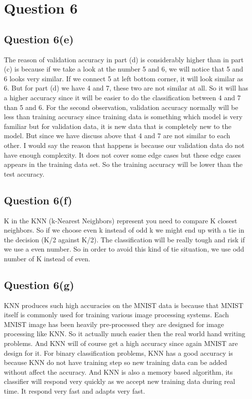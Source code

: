 \documentclass{article}
\begin{document}
        
\section{Question 6}
 \subsection{Question 6(e)} 
The reason of validation accuracy in part (d) is considerably higher than in part (c) is because if we take a look at the number 5 and 6, we will notice that 5 and 6 looks very similar. If we connect 5 at left bottom corner, it will look similar as 6. But for part (d) we have 4 and 7, these two are not similar at all. So it will has a higher accuracy since it will be easier to do the classification between 4 and 7 than 5 and 6. For the second observation, validation accuracy normally will be less than training accuracy since training data is something which model is very familiar but for validation data, it is new data that is completely new to the model. But since we have discuss above that 4 and 7 are not similar to each other. I would say the reason that happens is because our validation data do not have enough complexity. It does not cover some edge cases but these edge cases appears in the training data set. So the training accuracy will be lower than the test accuracy.
 \subsection{Question 6(f)} 
 K in the KNN (k-Nearest Neighbors) represent you need to compare K closest neighbors. So if we choose even k instead of odd k we might end up with a tie in the decision (K/2 against K/2). The classification will be really tough and risk if we use a even number. So in order to avoid this kind of tie situation, we use odd number of K instead of even. 
  \subsection{Question 6(g)} 
KNN produces such high accuracies on the MNIST data is because that MNIST itself is commonly used for training various image processing systems. Each MNIST image has been heavily pre-processed they are designed for image processing like KNN. So it actually much easier then the real world hand writing problems. And KNN will of course get a high accuracy since again MNIST are design for it. For binary classification problems, KNN has a good accuracy is because KNN do not have training step so new training data can be added without affect the accuracy. And KNN is also a memory based algorithm, its classifier will respond very quickly as we accept new training data during real time. It respond very fast and adapts very fast.
\end{document}
